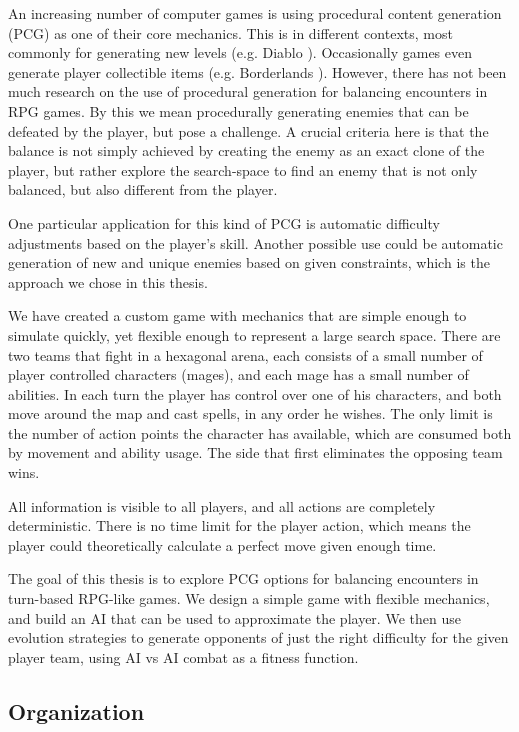 
An increasing number of computer games is using procedural content generation
(PCG) as one of their core mechanics. This is in different contexts, most
commonly for generating new levels (e.g. Diablo \citep{diablo}). Occasionally games
even generate player collectible items (e.g. Borderlands \citep{borderlands}). However,
there has not been much research on the use of procedural generation for
balancing encounters in RPG games. By this we mean procedurally generating
enemies that can be defeated by the player, but pose a challenge. A crucial
criteria here is that the balance is not simply achieved by creating the enemy
as an exact clone of the player, but rather explore the search-space to find an
enemy that is not only balanced, but also different from the player.

One particular application for this kind of PCG is automatic difficulty
adjustments based on the player's skill. Another possible use could be
automatic generation of new and unique enemies based on given constraints,
which is the approach we chose in this thesis.

We have created a custom game with mechanics that are simple enough to simulate
quickly, yet flexible enough to represent a large search space. There are two
teams that fight in a hexagonal arena, each consists of a small number of
player controlled characters (mages), and each mage has a small number of
abilities. In each turn the player has control over one of his characters, and
both move around the map and cast spells, in any order he wishes. The only
limit is the number of action points the character has available, which are
consumed both by movement and ability usage. The side that first eliminates the
opposing team wins.

All information is visible to all players, and all actions are completely
deterministic. There is no time limit for the player action, which means the
player could theoretically calculate a perfect move given enough time.

The goal of this thesis is to explore PCG options for balancing encounters in
turn-based RPG-like games. We design a simple game with flexible mechanics, and
build an AI that can be used to approximate the player. We then use evolution strategies
to generate opponents of just the right difficulty for the given player team, using AI vs
AI combat as a fitness function.

\subsection*{Organization}

